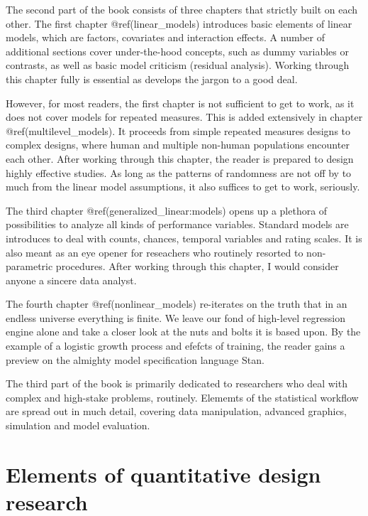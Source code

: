 \documentclass[]{svmono}
\theoremstyle{definition}
\theoremstyle{definition}
\theoremstyle{definition}
\theoremstyle{remark}
\begin{document}
The second part of the book consists of three chapters that strictly
built on each other. The first chapter @ref(linear\_models) introduces
basic elements of linear models, which are factors, covariates and
interaction effects. A number of additional sections cover
under-the-hood concepts, such as dummy variables or contrasts, as well
as basic model criticism (residual analysis). Working through this
chapter fully is essential as develops the jargon to a good deal.

However, for most readers, the first chapter is not sufficient to get to
work, as it does not cover models for repeated measures. This is added
extensively in chapter @ref(multilevel\_models). It proceeds from simple
repeated measures designs to complex designs, where human and multiple
non-human populations encounter each other. After working through this
chapter, the reader is prepared to design highly effective studies. As
long as the patterns of randomness are not off by to much from the
linear model assumptions, it also suffices to get to work, seriously.

The third chapter @ref(generalized\_linear:models) opens up a plethora
of possibilities to analyze all kinds of performance variables. Standard
models are introduces to deal with counts, chances, temporal variables
and rating scales. It is also meant as an eye opener for reseachers who
routinely resorted to non-parametric procedures. After working through
this chapter, I would consider anyone a sincere data analyst.

The fourth chapter @ref(nonlinear\_models) re-iterates on the truth that
in an endless universe everything is finite. We leave our fond of
high-level regression engine alone and take a closer look at the nuts
and bolts it is based upon. By the example of a logistic growth process
and efefcts of training, the reader gains a preview on the almighty
model specification language Stan.

The third part of the book is primarily dedicated to researchers who
deal with complex and high-stake problems, routinely. Elememts of the
statistical workflow are spread out in much detail, covering data
manipulation, advanced graphics, simulation and model evaluation.

\chapter{Elements of quantitative design
research}\label{design_research}
\end{document}
